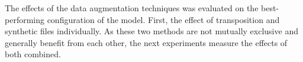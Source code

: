 
The effects of the data augmentation techniques was
evaluated on the best-performing configuration of the model.
First, the effect of transposition and synthetic files
individually. As these two methods are not mutually
exclusive and generally benefit from each other, the next
experiments measure the effects of both combined. 



